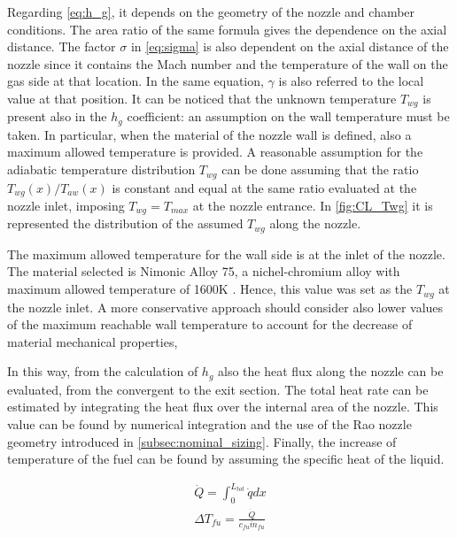 \vspace{3mm}
Regarding \autoref{eq:h_g}, it depends on the geometry of the nozzle and chamber conditions. The area ratio of the same formula gives the dependence on the axial distance. The factor $\sigma$ in \autoref{eq:sigma} is also dependent on the axial distance of the nozzle since it contains the Mach number and the temperature of the wall on the gas side at that location. In the same equation, $\gamma$ is also referred to the local value at that position. It can be noticed that the unknown temperature $T_{wg}$ is present also in the $h_g$ coefficient: an assumption on the wall temperature must be taken. In particular, when the material of the nozzle wall is defined, also a maximum allowed temperature is provided. A reasonable assumption for the adiabatic temperature distribution  $T_{wg}$ can be done assuming that the ratio  $T_{wg} (x) / T_{aw} (x)$ is constant and equal at the same ratio evaluated at the nozzle inlet, imposing $T_{wg} = T_{max}$ at the nozzle entrance.
In \autoref{fig:CL_Twg} it is represented the distribution of the assumed $T_{wg}$ along the nozzle.


The maximum allowed temperature for the wall side is at the inlet of the nozzle. The material selected is Nimonic Alloy 75, a nichel-chromium alloy with maximum allowed temperature of 1600K \cite{nimonic}. Hence, this value was set as the $T_{wg}$ at the nozzle inlet. A more conservative approach should consider also lower values of the maximum reachable wall temperature to account for the decrease of material mechanical properties,

In this way, from the calculation of $h_g$ also the heat flux along the nozzle can be evaluated, from the convergent to the exit section.
The total heat rate can be estimated by integrating the heat flux over the internal area of the nozzle. This value can be found by numerical integration and the use of the Rao nozzle geometry introduced in \autoref{subsec:nominal_sizing}. Finally, the increase of temperature of the fuel can be found by assuming the specific heat of the liquid.

\begin{gather}
    \dot{Q} = \int_{0}^{L_{tot}} \dot{q} dx
    \\
    \Delta T_{fu} = \frac{\dot{Q}}{c_{fu} \dot{m}_{fu}}
\end{gather}


